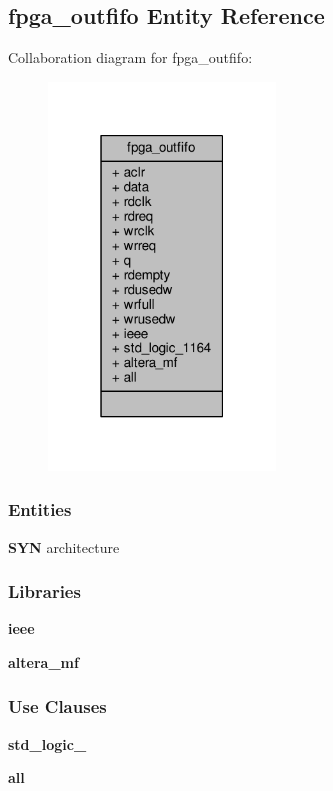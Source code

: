 \subsection{fpga\+\_\+outfifo Entity Reference}
\label{classfpga__outfifo}


Collaboration diagram for fpga\+\_\+outfifo\+:\nopagebreak
\begin{figure}[H]
\begin{center}
\leavevmode
\includegraphics[width=171pt]{d6/d7e/classfpga__outfifo__coll__graph}
\end{center}
\end{figure}
\subsubsection*{Entities}
\begin{DoxyCompactItemize}
\item 
{\bf S\+YN} architecture
\end{DoxyCompactItemize}
\subsubsection*{Libraries}
 \begin{DoxyCompactItemize}
\item 
{\bf ieee} 
\item 
{\bf altera\+\_\+mf} 
\end{DoxyCompactItemize}
\subsubsection*{Use Clauses}
 \begin{DoxyCompactItemize}
\item 
{\bf std\+\_\+logic\+\_}   
\item 
{\bf  all }   
\end{DoxyCompactItemize}
